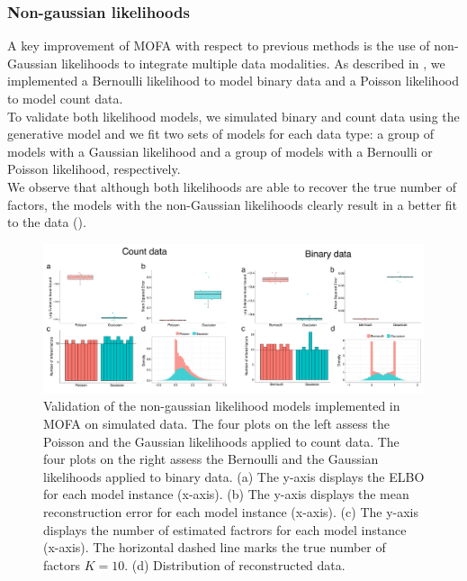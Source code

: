 \subsubsection{Non-gaussian likelihoods}  \label{section:mofa_nongaussian_results}
A key improvement of MOFA with respect to previous methods is the use of non-Gaussian likelihoods to integrate multiple data modalities. As described in , we implemented a Bernoulli likelihood to model binary data and a Poisson likelihood to model count data.\\
To validate both likelihood models, we simulated binary and count data using the generative model and we fit two sets of models for each data type: a group of models with a Gaussian likelihood and a group of models with a Bernoulli or Poisson likelihood, respectively.\\
We observe that although both likelihoods are able to recover the true number of factors, the models with the non-Gaussian likelihoods clearly result in a better fit to the data ().

\begin{figure}[H]
	\centering 	
	\includegraphics[width=1.0\textwidth]{MOFA_nongaussian}
	\caption{Validation of the non-gaussian likelihood models implemented in MOFA on simulated data. The four plots on the left assess the Poisson and the Gaussian likelihoods applied to count data. The four plots on the right assess the Bernoulli and the Gaussian likelihoods applied to binary data. (a) The y-axis displays the ELBO for each model instance (x-axis). (b) The y-axis displays the mean reconstruction error for each model instance (x-axis). (c) The y-axis displays the number of estimated factrors for each model instance (x-axis). The horizontal dashed line marks the true number of factors $K=10$. (d) Distribution of reconstructed data.}
	\label{fig:MOFA_nongaussian}
\end{figure}


